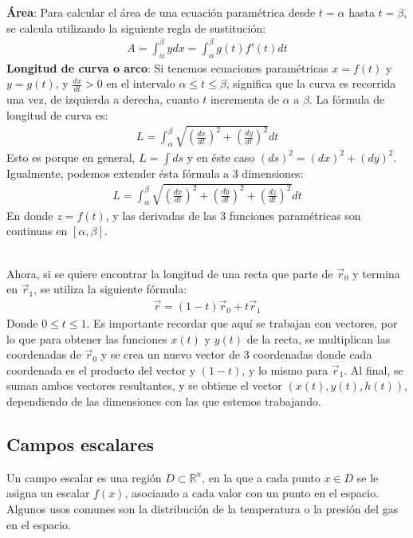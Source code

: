 \documentclass[12pt, letterpaper]{report}
\begin{document}
\textbf{Área}: Para calcular el área de una ecuación paramétrica desde $t = \alpha$ hasta $t = \beta$, se calcula utilizando la siguiente regla de sustitución: 
\begin{align}
A = \int_{\alpha}^{\beta}ydx = \int_{\alpha}^{\beta} g(t)f'(t)dt
\end{align}
\textbf{Longitud de curva o arco}: Si tenemos ecuaciones paramétricas $x = f(t)$ y $y=g(t)$, y $\frac{dx}{dt} > 0$ en el intervalo $\alpha \leq t \leq \beta$, significa que 
la curva es recorrida una vez, de izquierda a derecha, cuanto $t$ incrementa de $\alpha$ a $\beta$. La fórmula de longitud de curva es: 
\begin{align}
L = \int_{\alpha}^{\beta} \sqrt{(\frac{dx}{dt})^2 + (\frac{dy}{dt})^2} dt
\end{align}Esto es porque en general, $L = \int ds$ y en éste caso $(ds)^2 = (dx)^2 + (dy)^2$. Igualmente, podemos extender ésta fórmula a 3 dimensiones:
\begin{align}
    L = \int_{\alpha}^{\beta} \sqrt{(\frac{dx}{dt})^2 + (\frac{dy}{dt})^2 + (\frac{dz}{dt})^2} dt
\end{align}En donde $z = f(t)$, y las derivadas de las 3 funciones paramétricas son continuas en $[\alpha, \beta]$. \\ 

Ahora, si se quiere encontrar la longitud de una recta que parte de $\vec{r}_0$ y termina en $\vec{r}_1$, se utiliza la siguiente fórmula: 
\begin{align}
    \vec{r} = (1-t)\vec{r}_0 + t \vec{r}_1
\end{align}Donde $0 \leq t \leq 1$. Es importante recordar que aquí se trabajan con vectores, por lo que para obtener las funciones $x(t)$ y $y(t)$ de la recta, 
se multiplican las coordenadas de $\vec{r}_0$ y se crea un nuevo vector de 3 coordenadas donde cada coordenada es el producto del vector 
y $(1-t)$, y lo mismo para $\vec{r}_1$. Al final, se suman ambos vectores resultantes, y se obtiene el vector $(x(t), y(t), h(t))$, dependiendo de las 
dimensiones con las que estemos trabajando. 
\subsection*{Campos escalares}
Un campo escalar es una región $D \subset \mathbb{R}^n$, en la que a cada punto $x \in D$ se le asigna un escalar $f(x)$, asociando a cada valor 
con un punto en el espacio. Algunos usos comunes son la distribución de la temperatura o la presión del gas en el espacio. \\ 
\end{document}
